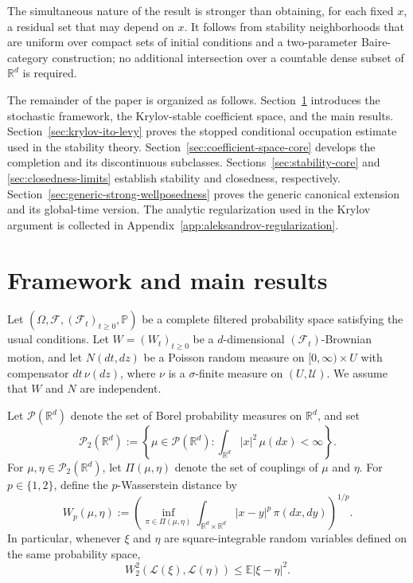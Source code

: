 \documentclass[12pt,oneside, reqno]{amsart}
\numberwithin{equation}{section}
\begin{document}
	The simultaneous nature of the result is stronger than obtaining, for
	each fixed $x$, a residual set that may depend on $x$. It follows from
	stability neighborhoods that are uniform over compact sets of initial
	conditions and a two-parameter Baire-category construction; no additional
	intersection over a countable dense subset of $\mathbb R^d$ is required.
	
	The remainder of the paper is organized as follows.
	Section~\ref{sec:framework-main} introduces the stochastic framework, the
	Krylov-stable coefficient space, and the main results.
	Section~\ref{sec:krylov-ito-levy} proves the stopped conditional
	occupation estimate used in the stability theory.
	Section~\ref{sec:coefficient-space-core} develops the completion and its
	discontinuous subclasses. Sections~\ref{sec:stability-core} and
	\ref{sec:closedness-limits} establish stability and closedness,
	respectively. Section~\ref{sec:generic-strong-wellposedness} proves the
	generic canonical extension and its global-time version. The analytic
	regularization used in the Krylov argument is collected in
	Appendix~\ref{app:aleksandrov-regularization}.
	
	\section{Framework and main results}
	\label{sec:framework-main}
	
	Let $(\Omega,\mathcal F,(\mathcal F_t)_{t\ge0},\mathbb P)$ be a complete filtered probability space satisfying the usual conditions. Let $W=(W_t)_{t\ge0}$ be a $d$-dimensional $(\mathcal F_t)$-Brownian motion, and let $N(dt,dz)$ be a Poisson random measure on $[0,\infty)\times U$ with compensator $dt\,\nu(dz)$, where $\nu$ is a $\sigma$-finite measure on $(U,\mathcal U)$. We assume that $W$ and $N$ are independent. 
	
	
	Let $\mathcal P(\mathbb R^d)$ denote the set of Borel probability
	measures on $\mathbb R^d$, and set
	\[
	\mathcal P_2(\mathbb R^d)
	:=
	\left\{\mu\in\mathcal P(\mathbb R^d):
	\int_{\mathbb R^d}|x|^2\,\mu(dx)<\infty\right\}.
	\]
	For $\mu,\eta\in\mathcal P_2(\mathbb R^d)$, let $\Pi(\mu,\eta)$
	denote the set of couplings of $\mu$ and $\eta$. For $p\in\{1,2\}$,
	define the $p$-Wasserstein distance by
	\[
	W_p(\mu,\eta)
	:=
	\left(
	\inf_{\pi\in\Pi(\mu,\eta)}
	\int_{\mathbb R^d\times\mathbb R^d}|x-y|^p\,\pi(dx,dy)
	\right)^{1/p}.
	\]
	In particular, whenever $\xi$ and $\eta$ are square-integrable random
	variables defined on the same probability space,
	\[
	W_2^2(\mathcal L(\xi),\mathcal L(\eta))
	\leq
	\mathbb E|\xi-\eta|^2.
	\]
	
\end{document}
